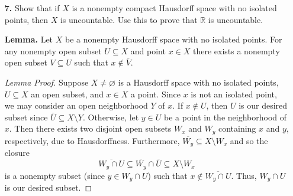 \documentclass[ 12pt ]{article}
\begin{document}
\begin{enumerate}
		\begin{proof}
			Let $X$ be a topological space and $\mathcal{C}$, a finite collection of compact subspaces of $X$. Consider an arbitrary open cover $\mathcal{U}$ of $\bigcup_{C \in
			\mathcal{C}} C$. For a particular compact subspace $C$, let $$\mathcal{U}_C = \{ C \cap U : U \in \mathcal{U} \}$$ denote the open cover $\mathcal{U}$ induced by $C$. Observe
			that $\mathcal{U}_C$, itself, is an open cover of $C$ and so there exists a finite open cover by assumption; let $\mathcal{U}_C' \subseteq \mathcal{U}$ denote the set of
			cover elements in $\mathcal{U}$ utilized to cover $C$. Thus, $$\bigcup_{C \in \mathcal{C}} \mathcal{U}_C'$$ is a finite collection of open subsets covering $\bigcup_{C \in
			\mathcal{C}} C$.
		\end{proof}


	\item[\textbf{7.}] Show that if $X$ is a nonempty compact Hausdorff space with no isolated points, then $X$ is uncountable. Use this to prove that $\mathbb{R}$ is uncountable.

		\textbf{Lemma.} Let $X$ be a nonempty Hausdorff space with no isolated points. For any nonempty open subset $U \subseteq X$ and point $x \in X$ there exists a nonempty open subset
			$V \subseteq U$ such that $x \notin \overline{V}$.
		
		\begin{proof}[Lemma Proof]
			Suppose $X \neq \varnothing$ is a Hausdorff space with no isolated points, $U \subseteq X$ an open subset, and $x \in X$ a point. Since $x$ is not an isolated point,
			we may consider an open neighborhood $Y$ of $x$. If $x \notin U$, then $U$ is our desired subset since $\overline{U} \subseteq X \setminus Y$. Otherwise, let $y \in U$
			be a point in the neighborhood of $x$. Then there exists two disjoint open subsets $W_x$ and $W_y$ containing $x$ and $y$, respectively, due to Hausdorffness. Furthermore,
			$\overline{W_y} \subseteq X \setminus W_x$ and so the closure $$\overline{W_y \cap U} \subseteq \overline{W_y} \cap \overline{U} \subseteq X \setminus W_x$$ is a nonempty
			subset (since $y \in W_y \cap U$) such that $x \notin \overline{W_y \cap U}$. Thus, $W_y \cap U$ is our desired subset.
		\end{proof}


\end{enumerate}
\end{document}
